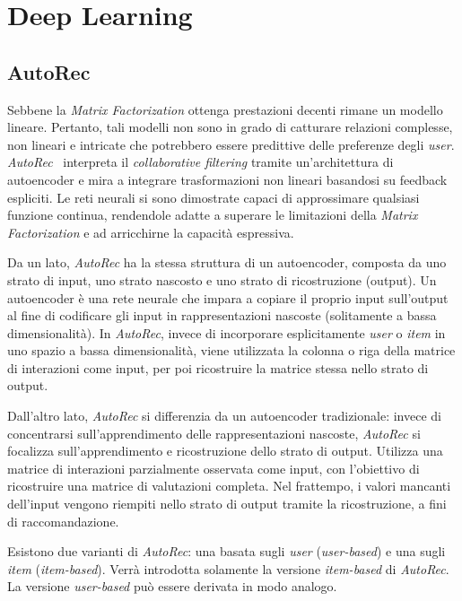\section{Deep Learning}

\subsection{AutoRec}\label{autorec}
Sebbene la \textit{Matrix Factorization} ottenga prestazioni decenti rimane un modello lineare. Pertanto, tali modelli non sono in grado di catturare relazioni complesse, non lineari e intricate che potrebbero essere predittive delle preferenze degli \textit{user}. \textit{AutoRec}~\cite{AutoRec} interpreta il \textit{collaborative filtering} tramite un'architettura di autoencoder e mira a integrare trasformazioni non lineari basandosi su feedback espliciti. Le reti neurali si sono dimostrate capaci di approssimare qualsiasi funzione continua, rendendole adatte a superare le limitazioni della \textit{Matrix Factorization} e ad arricchirne la capacità espressiva.

Da un lato, \textit{AutoRec} ha la stessa struttura di un autoencoder, composta da uno strato di input, uno strato nascosto e uno strato di ricostruzione (output). Un autoencoder è una rete neurale che impara a copiare il proprio input sull'output al fine di codificare gli input in rappresentazioni nascoste (solitamente a bassa dimensionalità). In \textit{AutoRec}, invece di incorporare esplicitamente \textit{user} o \textit{item} in uno spazio a bassa dimensionalità, viene utilizzata la colonna o riga della matrice di interazioni come input, per poi ricostruire la matrice stessa nello strato di output.

Dall'altro lato, \textit{AutoRec} si differenzia da un autoencoder tradizionale: invece di concentrarsi sull'apprendimento delle rappresentazioni nascoste, \textit{AutoRec} si focalizza sull'apprendimento e ricostruzione dello strato di output. Utilizza una matrice di interazioni parzialmente osservata come input, con l'obiettivo di ricostruire una matrice di valutazioni completa. Nel frattempo, i valori mancanti dell'input vengono riempiti nello strato di output tramite la ricostruzione, a fini di raccomandazione.

Esistono due varianti di \textit{AutoRec}: una basata sugli \textit{user} (\textit{user-based}) e una sugli \textit{item} (\textit{item-based}). Verrà introdotta solamente la versione \textit{item-based} di \textit{AutoRec}. La versione \textit{user-based} può essere derivata in modo analogo.


